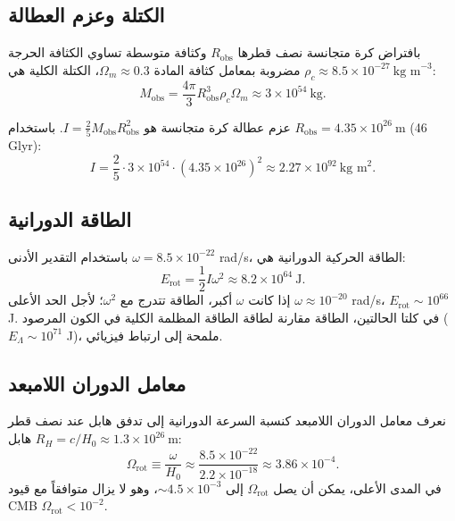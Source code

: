 \documentclass[12pt,a4paper]{article}
\newcommand{\Omegarot}{\Omega_{\mathrm{rot}}}
\begin{document}
	\subsection{الكتلة وعزم العطالة}
	
	بافتراض كرة متجانسة نصف قطرها \(R_{\text{obs}}\) وكثافة متوسطة تساوي الكثافة الحرجة \(\rho_c \approx 8.5\times10^{-27}\ \text{kg m}^{-3}\) مضروبة بمعامل كثافة المادة \(\Omega_m \approx 0.3\)، الكتلة الكلية هي:
	\begin{equation}
		M_{\text{obs}} = \frac{4\pi}{3} R_{\text{obs}}^3 \rho_c \Omega_m \approx 3 \times 10^{54}\ \text{kg}.
	\end{equation}
	
	عزم عطالة كرة متجانسة هو \(I = \frac{2}{5} M_{\text{obs}} R_{\text{obs}}^2\). باستخدام \(R_{\text{obs}} = 4.35\times10^{26}\ \text{m}\) (46 Glyr):
	\begin{equation}
		I = \frac{2}{5} \cdot 3\times10^{54} \cdot (4.35\times10^{26})^2 \approx 2.27 \times 10^{92}\ \text{kg m}^2.
	\end{equation}
	
	\subsection{الطاقة الدورانية}
	
	باستخدام التقدير الأدنى \(\omega = 8.5\times10^{-22}\) rad/s، الطاقة الحركية الدورانية هي:
	\begin{equation}
		E_{\text{rot}} = \frac{1}{2} I \omega^2 \approx 8.2 \times 10^{64}\ \text{J}.
	\end{equation}
	إذا كانت \(\omega\) أكبر، الطاقة تتدرج مع \(\omega^2\)؛ لأجل الحد الأعلى \(\omega \approx 10^{-20}\) rad/s، \(E_{\text{rot}} \sim 10^{66}\) J. في كلتا الحالتين، الطاقة مقارنة لطاقة الطاقة المظلمة الكلية في الكون المرصود (\(E_{\Lambda} \sim 10^{71}\) J)، ملمحة إلى ارتباط فيزيائي.
	
	\subsection{معامل الدوران اللامبعد}
	
	نعرف معامل الدوران اللامبعد كنسبة السرعة الدورانية إلى تدفق هابل عند نصف قطر هابل \(R_H = c/H_0 \approx 1.3\times10^{26}\ \text{m}\):
	\begin{equation}
		\Omegarot \equiv \frac{\omega}{H_0} \approx \frac{8.5\times10^{-22}}{2.2\times10^{-18}} \approx 3.86\times10^{-4}.
	\end{equation}
	في المدى الأعلى، يمكن أن يصل \(\Omegarot\) إلى \(\sim 4.5\times10^{-3}\)، وهو لا يزال متوافقاً مع قيود CMB \(\Omegarot < 10^{-2}\).
	
\end{document}
